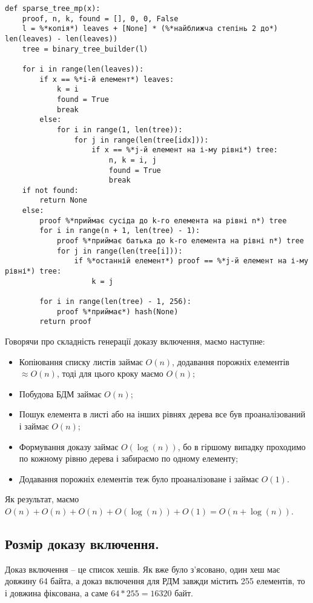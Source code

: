 \documentclass[a4paper, 12pt]{article}
\begin{document}
\begin{lstlisting}
def sparse_tree_mp(x):
    proof, n, k, found = [], 0, 0, False
    l = %*копія*) leaves + [None] * (%*найближча степінь 2 до*) len(leaves) - len(leaves))
    tree = binary_tree_builder(l)
    
    for i in range(len(leaves)):
        if x == %*i-й елемент*) leaves:
            k = i
            found = True
            break
        else:
            for i in range(1, len(tree)):
                for j in range(len(tree[idx])):
                    if x == %*j-й елемент на і-му рівні*) tree:
                        n, k = i, j
                        found = True
                        break
    if not found:
        return None
    else:
        proof %*приймає сусіда до k-го елемента на рівні n*) tree
        for i in range(n + 1, len(tree) - 1):
            proof %*приймає батька до k-го елемента на рівні n*) tree
            for j in range(len(tree[i])):
                if %*останній елемент*) proof == %*j-й елемент на і-му рівні*) tree:
                    k = j
    
        for i in range(len(tree) - 1, 256):
            proof %*приймає*) hash(None)   
        return proof
\end{lstlisting}

\par Говорячи про складність генерації доказу включення, маємо наступне:

\begin{itemize}
	\item Копіювання списку листів займає $O(n)$, додавання порожніх елементів $\approx O(n)$, тоді для цього кроку маємо $O(n)$;
	\item Побудова БДМ займає $O(n)$;
	\item Пошук елемента в листі або на інших рівнях дерева все був проаналізований і займає $O(n)$;
	\item Формування доказу займає $O(\log(n))$, бо в гіршому випадку проходимо по кожному рівню дерева і забираємо по одному елементу;
	\item Додавання порожніх елементів теж було проаналізоване і займає $O(1)$.
\end{itemize}
\par Як результат, маємо $O(n) + O(n) + O(n) + O(\log(n)) + O(1) = O(n + \log(n))$.


\subsection{Розмір доказу включення.}
\par Доказ включення -- це список хешів. Як вже було з'ясовано, один хеш має довжину 64 байта, а доказ включення для РДМ завжди містить 255 елементів, то і довжина фіксована, а саме $64 * 255 = 16320$ байт.
\end{document}

